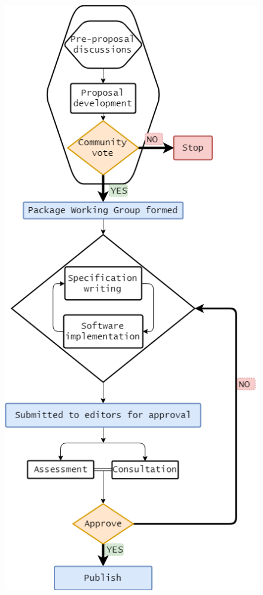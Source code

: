 \documentclass[]{draft-sbml-paper}
\begin{document}
\begin{figure}
  \begin{center}
    \includegraphics{res/Pkg_develop_v2.png}
  \end{center}
\end{figure}
\end{document}
